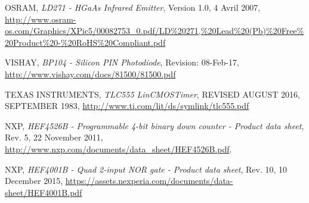 \documentclass[french]{layout/Report}
\begin{document}
\begin{thebibliography}{9}

	OSRAM,
	\textit{LD271 - HGaAs Infrared Emitter},
	Version 1.0,
	4 Avril 2007,
	\url{http://www.osram-os.com/Graphics/XPic5/00082753_0.pdf/LD%20271,%20Lead%20(Pb)%20Free%20Product%20-%20RoHS%20Compliant.pdf}

		VISHAY,
		\textit{BP104 - Silicon PIN Photodiode},
		Revision: 08-Feb-17,
		\url{http://www.vishay.com/docs/81500/81500.pdf}

		TEXAS INSTRUMENTS,
		\textit{TLC555 LinCMOS\texttrademark Timer},
		REVISED AUGUST 2016,
		SEPTEMBER 1983,
		\url{http://www.ti.com/lit/ds/symlink/tlc555.pdf}

		NXP,
		\textit{HEF4526B - Programmable 4-bit binary down counter - Product data sheet},
		Rev. 5,
		22 November 2011,
		\url{http://www.nxp.com/documents/data_sheet/HEF4526B.pdf}.

		NXP,
		\textit{HEF4001B - Quad 2-input NOR gate - Product data sheet},
		Rev. 10,
		10 December 2015,
		\url{https://assets.nexperia.com/documents/data-sheet/HEF4001B.pdf}

\end{thebibliography}


\end{document}
